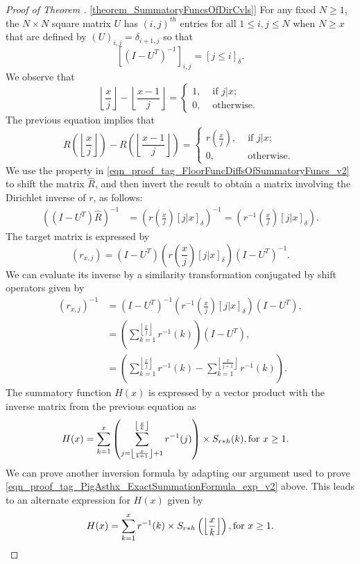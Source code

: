 \documentclass[11pt,reqno,a4letter]{article}
\newcommand{\hlocalref}[1]{\hyperref[#1]{\ref{#1}}}
\numberwithin{equation}{section}
\numberwithin{figure}{section}
\numberwithin{table}{section}
\newcommand{\Iverson}[1]{\ensuremath{\left[#1\right]_{\delta}}}
\newcommand{\floor}[1]{\left\lfloor #1 \right\rfloor}
\newcommand{\Floor}[2]{\ensuremath{\left\lfloor \frac{#1}{#2} \right\rfloor}}
\theoremstyle{plain}
\numberwithin{theorem}{section}
\theoremstyle{definition}
\theoremstyle{remark}
\newcommand{\mathtext}[1]{\text{\rm #1}}
\begin{document}
\begin{proof}[Proof of Theorem \hlocalref{theorem_SummatoryFuncsOfDirCvls}]
For any fixed $N \geq 1$, the $N \times N$ square matrix $U$ 
has $(i,j)^{th}$ entries for all $1 \leq i,j \leq N$ when $N \geq x$ that are defined by 
$(U)_{i,j} = \delta_{i+1,j}$ so that 
\[
\left[\left(I - U^T\right)^{-1}\right]_{i,j} = \Iverson{j \leq i}. 
\]
We observe that 
\[
\Floor{x}{j} - \Floor{x-1}{j} = \begin{cases} 
     1, & \text{ if $j|x$; } \\ 
     0, & \text{ otherwise. } 
     \end{cases} 
\] 
The previous equation implies that 
\begin{equation} 
\label{eqn_proof_tag_FloorFuncDiffsOfSummatoryFuncs_v2} 
R\left(\floor{\frac{x}{j}}\right) - R\left(\floor{\frac{x-1}{j}}\right) = 
     \begin{cases} 
     r\left(\frac{x}{j}\right), & \text{ if $j|x$; } \\ 
     0, & \text{ otherwise. } 
     \end{cases}
\end{equation} 
We use the property in \eqref{eqn_proof_tag_FloorFuncDiffsOfSummatoryFuncs_v2} 
to shift the matrix $\hat{R}$, and then invert the result to obtain a matrix involving the 
Dirichlet inverse of $r$, as follows: 
\begin{align*} 
\left(\left(I-U^{T}\right) \hat{R}\right)^{-1} & = 
     \left(r\left(\frac{x}{j}\right) \Iverson{j|x}\right)^{-1} = 
     \left(r^{-1}\left(\frac{x}{j}\right) \Iverson{j|x}\right). 
\end{align*} 
The target matrix is expressed by 
$$(r_{x,j}) = \left(I-U^{T}\right) \left(r\left(\frac{x}{j}\right) \Iverson{j|x}\right) \left(I-U^{T}\right)^{-1}.$$
We can evaluate its inverse by a similarity transformation conjugated by 
shift operators given by 
\begin{align*} 
(r_{x,j})^{-1} & = \left(I-U^{T}\right)^{-1} \left(r^{-1}\left(\frac{x}{j}\right) 
     \Iverson{j|x}\right) \left(I-U^{T}\right), \\ 
     & = \left(\sum_{k=1}^{\floor{\frac{x}{j}}} r^{-1}(k)\right) \left(I-U^{T}\right), \\ 
     & = \left(\sum_{k=1}^{\floor{\frac{x}{j}}} r^{-1}(k) - \sum_{k=1}^{\floor{\frac{x}{j+1}}} r^{-1}(k)\right). 
\end{align*} 
The summatory function $H(x)$ is expressed 
by a vector product with the inverse matrix from the previous equation as 
\begin{align*} 
H(x) & = \sum_{k=1}^x \left(\sum_{j=\floor{\frac{x}{k+1}}+1}^{\floor{\frac{x}{k}}} r^{-1}(j)\right) 
	\times S_{r \ast h}(k), \mathtext{ for } x \geq 1. 
\end{align*} 
We can prove another inversion formula by adapting our argument used to prove 
\eqref{eqn_proof_tag_PigAsthx_ExactSummationFormula_exp_v2} above. 
This leads to an alternate expression for $H(x)$ given by 
\[
H(x) = \sum_{k=1}^{x} r^{-1}(k) \times S_{r \ast h}\left(\Floor{x}{k}\right), 
     \mathtext{ for } x \geq 1. 
     \qedhere 
\]
\end{proof} 
\end{document}
